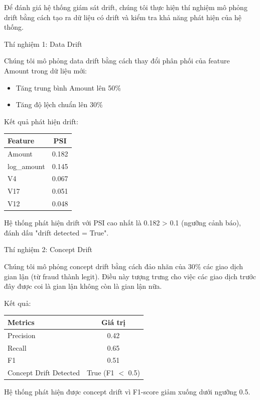 Để đánh giá hệ thống giám sát drift, chúng tôi thực hiện thí nghiệm mô phỏng drift bằng cách tạo ra dữ liệu có drift và kiểm tra khả năng phát hiện của hệ thống.

Thí nghiệm 1: Data Drift

Chúng tôi mô phỏng data drift bằng cách thay đổi phân phối của feature Amount trong dữ liệu mới:
\begin{itemize}
    \item Tăng trung bình Amount lên 50\%
    \item Tăng độ lệch chuẩn lên 30\%
\end{itemize}

Kết quả phát hiện drift:

\begin{center}
\begin{tabular}{l|c}
    \textbf{Feature} & \textbf{PSI} \\
    \hline
    Amount & 0.182 \\
    log\_amount & 0.145 \\
    V4 & 0.067 \\
    V17 & 0.051 \\
    V12 & 0.048 \\
\end{tabular}
\end{center}

Hệ thống phát hiện drift với PSI cao nhất là 0.182 > 0.1 (ngưỡng cảnh báo), đánh dấu "drift detected = True".

Thí nghiệm 2: Concept Drift

Chúng tôi mô phỏng concept drift bằng cách đảo nhãn của 30\% các giao dịch gian lận (từ fraud thành legit). Điều này tượng trưng cho việc các giao dịch trước đây được coi là gian lận không còn là gian lận nữa.

Kết quả:
\begin{center}
\begin{tabular}{l|c}
    \textbf{Metrics} & \textbf{Giá trị} \\
    \hline
    Precision & 0.42 \\
    Recall & 0.65 \\
    F1 & 0.51 \\
    Concept Drift Detected & True (F1 $<$ 0.5) \\
\end{tabular}
\end{center}

Hệ thống phát hiện được concept drift vì F1-score giảm xuống dưới ngưỡng 0.5.

